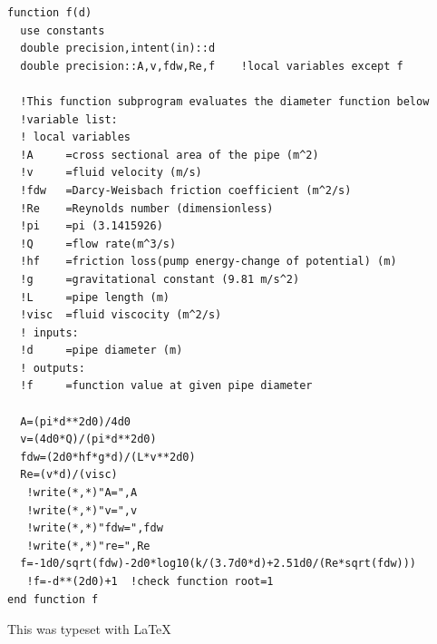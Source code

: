\documentclass[titlepage,11pt]{article}
\begin{document}
\begin{singlespace}
\begin{Verbatim}[frame=single]
function f(d)
  use constants
  double precision,intent(in)::d
  double precision::A,v,fdw,Re,f    !local variables except f

  !This function subprogram evaluates the diameter function below
  !variable list:
  ! local variables
  !A     =cross sectional area of the pipe (m^2)
  !v     =fluid velocity (m/s)
  !fdw   =Darcy-Weisbach friction coefficient (m^2/s)
  !Re    =Reynolds number (dimensionless)
  !pi    =pi (3.1415926)
  !Q     =flow rate(m^3/s)
  !hf    =friction loss(pump energy-change of potential) (m)
  !g     =gravitational constant (9.81 m/s^2)
  !L     =pipe length (m)
  !visc  =fluid viscocity (m^2/s)
  ! inputs:
  !d     =pipe diameter (m)
  ! outputs:
  !f     =function value at given pipe diameter

  A=(pi*d**2d0)/4d0
  v=(4d0*Q)/(pi*d**2d0)
  fdw=(2d0*hf*g*d)/(L*v**2d0)
  Re=(v*d)/(visc)
   !write(*,*)"A=",A
   !write(*,*)"v=",v
   !write(*,*)"fdw=",fdw
   !write(*,*)"re=",Re
  f=-1d0/sqrt(fdw)-2d0*log10(k/(3.7d0*d)+2.51d0/(Re*sqrt(fdw)))
   !f=-d**(2d0)+1  !check function root=1
end function f

\end{Verbatim}
\end{singlespace}

\noindent This was typeset with \LaTeX
\end{document}
